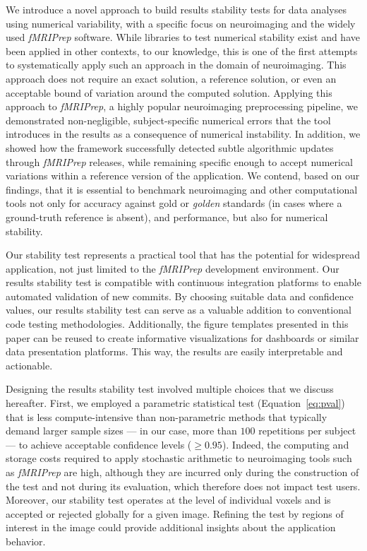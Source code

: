 \documentclass[lettersize,journal]{IEEEtran}
\newcommand{\fmriprep}{\emph{fMRIPrep}\xspace}
\begin{document}
{We introduce a novel approach to build results stability tests for data analyses using numerical variability, with a specific focus on neuroimaging and the widely used \fmriprep software. While libraries to test numerical stability exist and have been applied in other contexts, to our knowledge, this is one of the first attempts to systematically apply such an approach in the domain of neuroimaging.
This approach does not require an exact solution, a reference solution, or even an acceptable bound of variation around the computed solution.
Applying this approach to \fmriprep, a highly popular neuroimaging preprocessing pipeline, we demonstrated non-negligible, subject-specific numerical errors that the tool introduces in the results as a consequence of numerical instability.
In addition, we showed how the framework successfully detected subtle algorithmic updates through \fmriprep releases, while remaining specific enough to accept numerical variations within a reference version of the application.
We contend, based on our findings, that it is essential to benchmark neuroimaging and other computational tools not only for accuracy against gold or \emph{golden} standards (in cases where a ground-truth reference is absent), and performance, but also for numerical stability.

Our stability test represents a practical tool that has the potential for widespread application, not just limited to the \fmriprep development environment. Our results stability test is compatible with continuous integration platforms to enable automated validation of new commits. By choosing suitable data and confidence values, our results stability test can serve as a valuable addition to conventional code testing methodologies. Additionally, the figure templates presented in this paper can be reused to create informative visualizations for dashboards or similar data presentation platforms. This way, the results are easily interpretable and actionable.

Designing the results stability test involved multiple choices that we discuss hereafter.
First, we employed a parametric statistical test (Equation~\ref{eq:pval}) that is less compute-intensive than non-parametric methods that typically demand larger sample sizes --- in our case, more than $100$ repetitions per subject --- to achieve acceptable confidence levels ($\geq 0.95$).
Indeed, the computing and storage costs required to apply stochastic arithmetic to neuroimaging tools such as \fmriprep are high, although they are incurred only during the construction of the test and not during its evaluation, which therefore does not impact test users. Moreover, our stability test operates at the level of individual voxels and is accepted or rejected globally for a given image. Refining the test by regions of interest in the image could provide additional insights about the application behavior.

}
\end{document}
